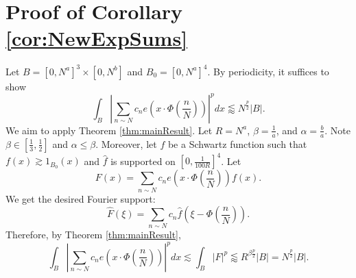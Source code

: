 \documentclass[12pt]{amsart}
\providecommand{\wh}{\widehat}
\begin{document}
\section{Proof of Corollary \ref{cor:NewExpSums}}\label{sec:FinalCor}
Let $B= [0,N^a]^3\times [0,N^b]$ and $B_0= [0,N^a]^4$. By periodicity, it suffices to show $$\int_B \left|\sum_{n\sim N}c_ne(x\cdot \Phi\left(\frac{n}{N}\right))\right|^{p} dx \lessapprox N^{\frac{p}{2}}|B|.$$
We aim to apply Theorem \ref{thm:mainResult}. Let $R=N^a$, $\beta = \frac{1}{a}$, and $\alpha = \frac{b}{a}$. Note $\beta \in [\frac{1}{3}, \frac{1}{2}]$ and $\alpha \le \beta$. Moreover, let $f$ be a Schwartz function such that $f(x) \gtrsim 1_{B_0}(x)$ and $\wh{f}$ is supported on $[0, \frac{1}{100 R}]^4$. Let $$F(x)= \sum_{n\sim N}c_ne(x\cdot \Phi\left(\frac{n}{N}\right))f(x).$$ We get the desired Fourier support: $$\wh{F}(\xi) = \sum_{n\sim N} c_n \wh{f}(\xi - \Phi\left(\frac{n}{N}\right)).$$ Therefore, by Theorem \ref{thm:mainResult}, $$\int_B \left|\sum_{n\sim N}c_ne(x\cdot \Phi\left(\frac{n}{N}\right))\right|^{p} dx\lesssim \int_B |F|^p \lessapprox R^{\beta \frac{p}{2}}|B|= N^{\frac{p}{2}}|B|.$$




\end{document}
